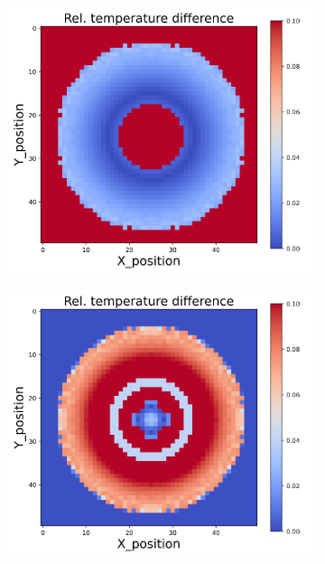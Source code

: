 \begin{figure}[h]
\begin{minipage}{\textwidth}
\begin{subfigure}{0.3\textwidth}
        \end{subfigure}
        \begin{subfigure}{0.3\textwidth}
            \centering
            \includegraphics[width=\textwidth]{figures/raw_data/26/linear/T_bias.jpg}
        \end{subfigure}
        \begin{subfigure}{0.3\textwidth}
            \centering
            \includegraphics[width=\textwidth]{figures/raw_data/31/linear/T_bias.jpg}

\end{subfigure}
\end{minipage}
\end{figure}

